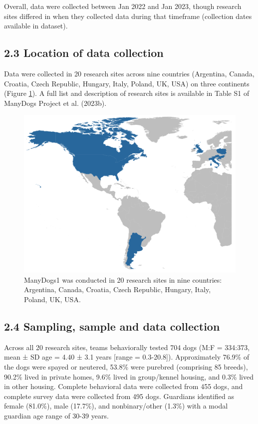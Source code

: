 \documentclass[
  man,floatsintext]{apa6}
\begin{document}
Overall, data were collected between Jan 2022 and Jan 2023, though research sites differed in when they collected data during that timeframe (collection dates available in dataset).

\hypertarget{location-of-data-collection}{%
\subsection{2.3 Location of data collection}\label{location-of-data-collection}}

Data were collected in 20 research sites across nine countries (Argentina, Canada, Croatia, Czech Republic, Hungary, Italy, Poland, UK, USA) on three continents (Figure \ref{fig:countries}). A full list and description of research sites is available in Table S1 of ManyDogs Project et al. (2023b).

\begin{figure}

{\centering \includegraphics[width=0.8\linewidth]{md1_countries} 

}

\caption{ManyDogs1 was conducted in 20 research sites in nine countries: Argentina, Canada, Croatia, Czech Republic, Hungary, Italy, Poland, UK, USA.}\label{fig:countries}
\end{figure}

\hypertarget{sampling-sample-and-data-collection}{%
\subsection{2.4 Sampling, sample and data collection}\label{sampling-sample-and-data-collection}}

Across all 20 research sites, teams behaviorally tested 704 dogs (M:F = 334:373, mean ± SD age = 4.40 ± 3.1 years {[}range = 0.3-20.8{]}). Approximately 76.9\% of the dogs were spayed or neutered, 53.8\% were purebred (comprising 85 breeds), 90.2\% lived in private homes, 9.6\% lived in group/kennel housing, and 0.3\% lived in other housing. Complete behavioral data were collected from 455 dogs, and complete survey data were collected from 495 dogs. Guardians identified as female (81.0\%), male (17.7\%), and nonbinary/other (1.3\%) with a modal guardian age range of 30-39 years.
\end{document}
